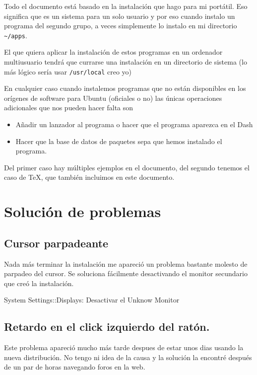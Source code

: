 Todo el documento está basado en la instalación que hago para mi
portátil. Eso significa que es un sistema para un solo usuario y por eso
cuando instalo un programa del segundo grupo, a veces simplemente lo
instalo en mi directorio \texttt{\textasciitilde{}/apps}.

El que quiera aplicar la instalación de estos programas en un ordenador
multiusuario tendrá que currarse una instalación en un directorio de
sistema (lo más lógico sería usar \texttt{/usr/local} creo yo)

En cualquier caso cuando instalemos programas que no están disponibles
en los orígenes de software para Ubuntu (oficiales o no) las únicas
operaciones adicionales que nos pueden hacer falta son

\begin{itemize}
\item
  Añadir un lanzador al programa o hacer que el programa aparezca en el
  Dash
\item
  Hacer que la base de datos de paquetes sepa que hemos instalado el
  programa.
\end{itemize}

Del primer caso hay múltiples ejemplos en el documento, del segundo
tenemos el caso de TeX, que también incluimos en este documento.

\section{Solución de problemas}\label{soluciuxf3n-de-problemas}

\subsection{Cursor parpadeante}\label{cursor-parpadeante}

Nada más terminar la instalación me apareció un problema bastante
molesto de parpadeo del cursor. Se soluciona fácilmente desactivando el
monitor secundario que creó la instalación.

System Settings::Displays: Desactivar el Unknow Monitor

\subsection{Retardo en el click izquierdo del
ratón.}\label{retardo-en-el-click-izquierdo-del-ratuxf3n.}

Este problema apareció mucho más tarde despues de estar unos dias usando
la nueva distribución. No tengo ni idea de la causa y la solución la
encontré después de un par de horas navegando foros en la web.

